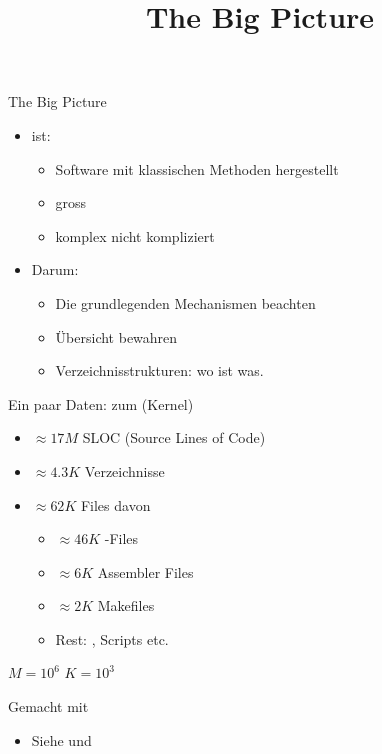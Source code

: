 \title[The Big Picture]{The Big Picture}
\frame{\titlepage}

\begin{frame}{The Big Picture}
 \begin{itemize}
  \item \linux ist:
  \begin{itemize}
   \item Software mit klassischen Methoden hergestellt
   \item gross
   \item komplex {\tiny nicht kompliziert}
  \end{itemize}
  \item Darum:
  \begin{itemize}
   \item \alert{Die grundlegenden Mechanismen beachten}
   \item \alert{Übersicht bewahren}
   \item \alert{Verzeichnisstrukturen}: wo ist was.
   \end{itemize}
  \end{itemize}
\end{frame}

\begin{frame}{Ein paar Daten: zum \linux (Kernel)}
 \begin{itemize}
  \item $\approx 17M$ SLOC (Source Lines of Code)
  \item $\approx 4.3K$ Verzeichnisse
  \item $\approx 62K$ Files davon
  \begin{itemize}
   \item $\approx 46 K$ -Files
   \item $\approx 6 K$ Assembler Files
   \item $\approx 2 K$ Makefiles
   \item Rest: , Scripts etc.
  \end{itemize}
 \end{itemize}
 \begin{remarks}
  \item $M=10^6$ $K=10^3$
  \item Gemacht mit  
  \begin{itemize}
   \item Siehe  und 
  \end{itemize}
 \end{remarks}
\end{frame}

